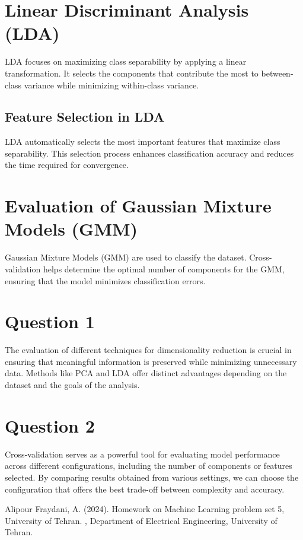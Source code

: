 \documentclass[DIV=calc, paper=a4, fontsize=11pt, twocolumn]{scrartcl}	 %
\begin{document}
\section{\small{Linear Discriminant Analysis (LDA)}}
   LDA focuses on maximizing class separability by applying a linear transformation. It selects the components 
   that contribute the most to between-class variance while minimizing within-class variance.

   \subsection{\small{Feature Selection in LDA}}
      LDA automatically selects the most important features that maximize class separability. 
      This selection process enhances classification accuracy and reduces the time required for convergence.

\section{\small{Evaluation of Gaussian Mixture Models (GMM)}}
   Gaussian Mixture Models (GMM) are used to classify the dataset. Cross-validation helps determine the 
   optimal number of components for the GMM, ensuring that the model minimizes classification errors.

\section{\small{Question 1}}
   The evaluation of different techniques for dimensionality reduction is crucial in ensuring that meaningful 
   information is preserved while minimizing unnecessary data. Methods like PCA and LDA offer distinct advantages 
   depending on the dataset and the goals of the analysis.

\section{\small{Question 2}}
   Cross-validation serves as a powerful tool for evaluating model performance across different configurations, 
   including the number of components or features selected. By comparing results obtained from various settings, 
   we can choose the configuration that offers the best trade-off between complexity and accuracy.


\begin{thebibliography}{99} %

  Alipour Fraydani, A. (2024).
  \newblock Homework on Machine Learning problem set 5, University of Tehran.
  , Department of Electrical Engineering, University of Tehran.
  
\end{thebibliography}

\end{document}

